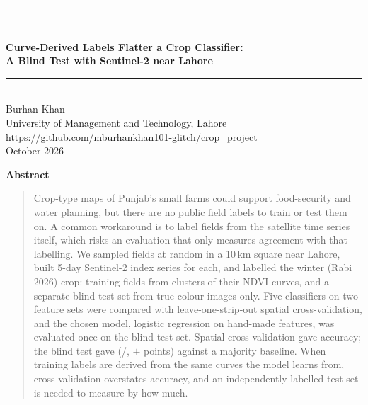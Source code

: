 \documentclass[10pt]{article}
\begin{document}
\begin{center}
  \rule{\textwidth}{1.6pt}\\[0.9em]
  {\LARGE\bfseries Curve-Derived Labels Flatter a Crop Classifier:\\[0.25em]
   A Blind Test with Sentinel-2 near Lahore\par}
  \vspace{0.55em}\rule{\textwidth}{0.6pt}\\[1.2em]
  {\large Burhan Khan}\\[0.2em]
  University of Management and Technology, Lahore\\[0.1em]
  {\small\url{https://github.com/mburhankhan101-glitch/crop_project}}\\[0.3em]
  {\small October 2026}
\end{center}
\vspace{0.6em}

\begin{center}\textbf{\large Abstract}\end{center}
\vspace{-0.4em}
\begin{quote}
Crop-type maps of Punjab's small farms could support food-security and water planning, but there are
no public field labels to train or test them on. A common workaround is to label fields from the
satellite time series itself, which risks an evaluation that only measures agreement with that
labelling. We sampled \NFields{} fields at random in a 10\,km square near Lahore, built 5-day
Sentinel-2 index series for each, and labelled the winter (Rabi 2026) crop: training fields from
clusters of their NDVI curves, and a separate blind test set from true-colour images only. Five
classifiers on two feature sets were compared with leave-one-strip-out spatial cross-validation, and
the chosen model, logistic regression on \NFeatB{} hand-made features, was evaluated once on the blind
test set. Spatial cross-validation gave \CVAcc{} accuracy; the blind test gave \TestAcc{}
(\TestCorrect/\NTest, $\pm$\TestMargin{} points) against a \BaselineTest{} majority baseline.
When training labels are derived from the same curves the model learns from, cross-validation
overstates accuracy, and an independently labelled test set is needed to measure by how much.
\end{quote}

\end{document}
